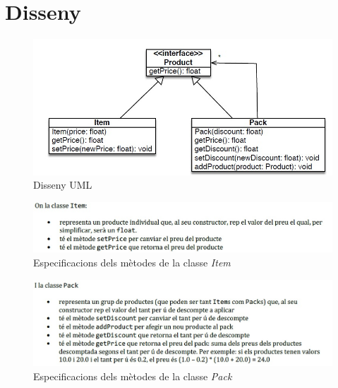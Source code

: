 \documentclass[a4paper,12pt]{article}
\begin{document}
	\begin{titlepage}
		\maketitle
		\thispagestyle{empty}
	\end{titlepage}
	\cleardoublepage
	\newpage

\tableofcontents
\listoffigures
\thispagestyle{empty}

\newpage
\section{Disseny}

\begin{figure}[H]
    \centering
    \includegraphics[scale = 0.7]{images/uml.jpg}
    \caption{Disseny UML}
    \label{fig:UML}
\end{figure}


\begin{figure}[H]
    \centering
    \includegraphics[scale = 0.6]{images/classe item.jpg}
    \caption{Especificacions dels mètodes de la classe \textit{Item}}
    \label{fig:Item}
\end{figure}

\begin{figure}[H]
    \centering
    \includegraphics[scale = 0.6]{images/classe pack.jpg}
    \caption{Especificacions dels mètodes de la classe \textit{Pack}}
    \label{fig:Pack}
\end{figure}
\end{document}
